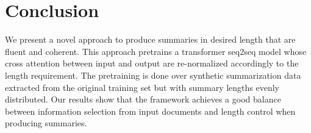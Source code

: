 \section{Conclusion}
\label{sec:conclude}
We present a novel approach to produce 
summaries in desired length that are fluent and coherent. 
This approach pretrains a transformer seq2seq model
whose cross attention between
input and output are re-normalized accordingly to the length requirement.
The pretraining is done over synthetic summarization data extracted from
the original training set but with summary lengths evenly distributed.
Our results show that the framework achieves a good balance between
information selection from input documents and length control when
producing summaries.
